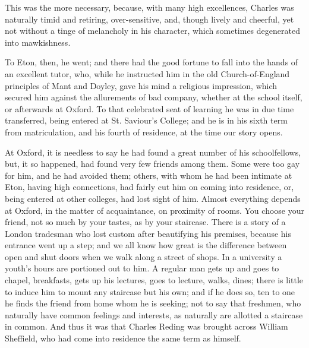 This was the more necessary, because, with many high excellences,
Charles was naturally timid and retiring, over-sensitive, and, though
lively and cheerful, yet not without a tinge of melancholy in his
character, which sometimes degenerated into mawkishness.

To Eton, then, he went; and there had the good fortune to fall into
the hands of an excellent tutor, who, while he instructed him in the
old Church-of-England principles of Mant and Doyley, gave his mind a
religious impression, which secured him against the allurements of bad
company, whether at the school itself, or afterwards at Oxford. To
that celebrated seat of learning he was in due time transferred, being
entered at St. Saviour's College; and he is in his sixth term from
matriculation, and his fourth of residence, at the time our story
opens.

At Oxford, it is needless to say he had found a great number of his
schoolfellows, but, it so happened, had found very few friends among
them. Some were too gay for him, and he had avoided them; others, with
whom he had been intimate at Eton, having high connections, had fairly
cut him on coming into residence, or, being entered at other colleges,
had lost sight of him. Almost everything depends at Oxford, in the
matter of acquaintance, on proximity of rooms. You choose your friend,
not so much by your tastes, as by your staircase. There is a story of
a London tradesman who lost custom after beautifying his premises,
because his entrance went up a step; and we all know how great is the
difference between open and shut doors when we walk along a street of
shops. In a university a youth's hours are portioned out to him. A
regular man gets up and goes to chapel, breakfasts, gets up his
lectures, goes to lecture, walks, dines; there is little to induce him to mount any staircase but his own; and if he does so, ten to one
he finds the friend from home whom he is seeking; not to say that
freshmen, who naturally have common feelings and interests, as
naturally are allotted a staircase in common. And thus it was that
Charles Reding was brought across William Sheffield, who had come into
residence the same term as himself.

